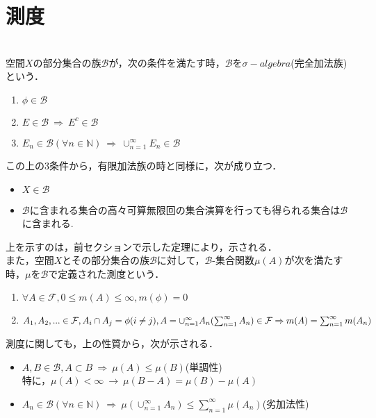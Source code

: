 \documentclass[11pt, a4paper, dvipdfmx]{jsarticle}
\theoremstyle{definition}
\newcommand{\N}{\mathbb{N}}
\newcommand{\F}{\mathcal{F}}
\begin{document}
\section{測度}
\\
空間$X$の部分集合の族$\mathcal{B}$が，次の条件を満たす時，$\mathcal{B}$を$\sigma-algebra$(完全加法族)という．
\begin{enumerate}
\renewcommand{\labelenumi}{(\roman{enumi})}
  \item $\phi \in \mathcal{B} $
  \item $E \in \mathcal{B} ~\Rightarrow~ E^c \in \mathcal{B}$
  \item $E_n\in \mathcal{B}(\forall n\in \N)~\Rightarrow~ \cup^{\infty}_{n=1}E_n\in \mathcal{B}$
\end{enumerate}
この上の3条件から，有限加法族の時と同様に，次が成り立つ．
\begin{itemize}
  \item $X \in \mathcal{B}$
  \item $\mathcal{B}$に含まれる集合の高々可算無限回の集合演算を行っても得られる集合は$\mathcal{B}$に含まれる.
\end{itemize}
上を示すのは，前セクションで示した定理により，示される．\\
また，空間$X$とその部分集合の族$\mathcal{B}$に対して，$\mathcal{B}$-集合関数$\mu(A)$が次を満たす時，$\mu$を$\mathcal{B}$で定義された測度という．
\begin{enumerate}
\renewcommand{\labelenumi}{(\roman{enumi})}
 \item $\forall A \in \F,0 \le m(A) \le \infty,m(\phi)=0$
 \item $A_1,A_2,... \in \mathcal{F},A_i \cap A_j = \phi(i \neq j),\\
      A = \cup_{n=1}^{\infty}A_n(\sum^{\infty}_{n=1}A_n) \in \mathcal{F} \Rightarrow m(A) = \sum_{n=1}^{\infty}m(A_n)$\\
\end{enumerate}
測度に関しても，上の性質から，次が示される．
\begin{itemize}
  \item $A,B\in \mathcal{B},A\subset B~\Rightarrow~\mu(A)\le \mu(B)$(単調性)\\
        特に，$\mu(A)<\infty~\rightarrow~\mu(B-A) = \mu(B)-\mu(A)$\\

  \item $A_n\in \mathcal{B}(\forall n\in \N)~\Rightarrow~\mu(\cup^{\infty}_{n=1}A_n)\le \sum^{\infty}_{n=1}\mu(A_n)$(劣加法性)
\end{itemize}
\end{document}
